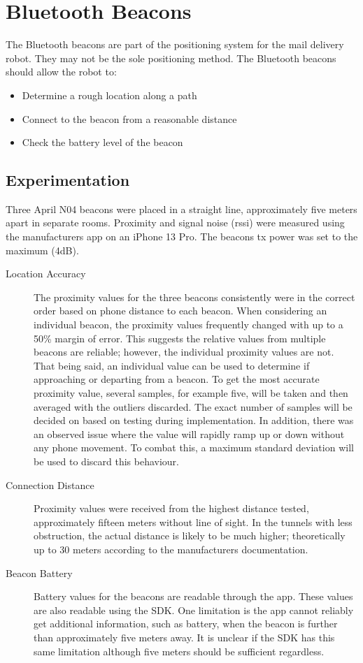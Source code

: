 \documentclass[12pt]{report}
\begin{document}
\section{Bluetooth Beacons}
The Bluetooth beacons are part of the positioning system for the mail delivery robot. They may not be the sole positioning method. The Bluetooth beacons should allow the robot to:
\begin{itemize}
\itemsep0em 
\item Determine a rough location along a path
\item Connect to the beacon from a reasonable distance
\item Check the battery level of the beacon
\end{itemize}
\subsection{Experimentation}
Three April N04 beacons were placed in a straight line, approximately five meters apart in separate rooms. Proximity and signal noise (rssi) were measured using the manufacturers app on an iPhone 13 Pro. The beacons tx power was set to the maximum (4dB).
\begin{description}
    \item[Location Accuracy] The proximity values for the three beacons consistently were in the correct order based on phone distance to each beacon. When considering an individual beacon, the proximity values frequently changed with up to a 50\% margin of error. This suggests the relative values from multiple beacons are reliable; however, the individual proximity values are not. That being said, an individual value can be used to determine if approaching or departing from a beacon. To get the most accurate proximity value, several samples, for example five, will be taken and then averaged with the outliers discarded. The exact number of samples will be decided on based on testing during implementation. In addition, there was an observed issue where the value will rapidly ramp up or down without any phone movement. To combat this, a maximum standard deviation will be used to discard this behaviour. 
    \item[Connection Distance] Proximity values were received from the highest distance tested, approximately fifteen meters without line of sight. In the tunnels with less obstruction, the actual distance is likely to be much higher; theoretically up to 30 meters according to the manufacturers documentation.
    \item[Beacon Battery] Battery values for the beacons are readable through the app. These values are also readable using the SDK. One limitation is the app cannot reliably get additional information, such as battery, when the beacon is further than approximately five meters away. It is unclear if the SDK has this same limitation although five meters should be sufficient regardless. 
\end{description}
\end{document}
